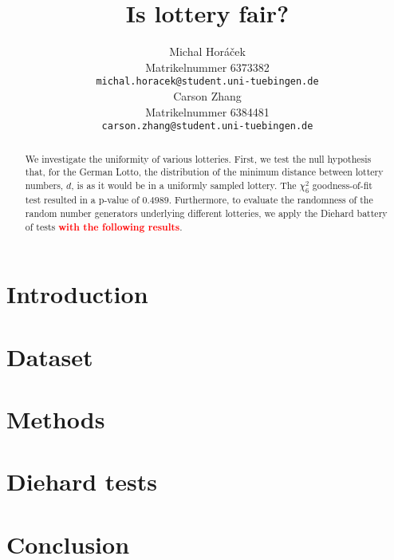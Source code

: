 \documentclass{article}
\title{Is lottery fair?}
\author{%
  Michal Horáček\\
  Matrikelnummer 6373382\\
  \texttt{michal.horacek@student.uni-tuebingen.de} \\
  \And
  Carson Zhang\\
  Matrikelnummer 6384481\\
  \texttt{carson.zhang@student.uni-tuebingen.de} \\
}
\newcommand{\todo}[1]{\textcolor{red}{\textbf{#1}}}
\begin{document}
\maketitle

\begin{abstract}
    We investigate the uniformity of various lotteries. 
    First, we test the null hypothesis that, for the German Lotto, the distribution of the minimum distance between
    lottery numbers, $d$, is as it would be in a uniformly sampled lottery. The $\chi^2_6$ goodness-of-fit
    test resulted in a p-value of $0.4989$.
    Furthermore, to evaluate the randomness of the random number generators underlying different lotteries,
    we apply the Diehard battery of tests \todo{with the following results}.
\end{abstract}

\section{Introduction}
\label{sec:introduction}


\section{Dataset}
\label{sec:dataset}


\section{Methods}
\label{sec:methods}


% 

\section{Diehard tests}
\label{sec:diehard}


\section{Conclusion}
\label{sec:conclusion}


\newpage



\end{document}
